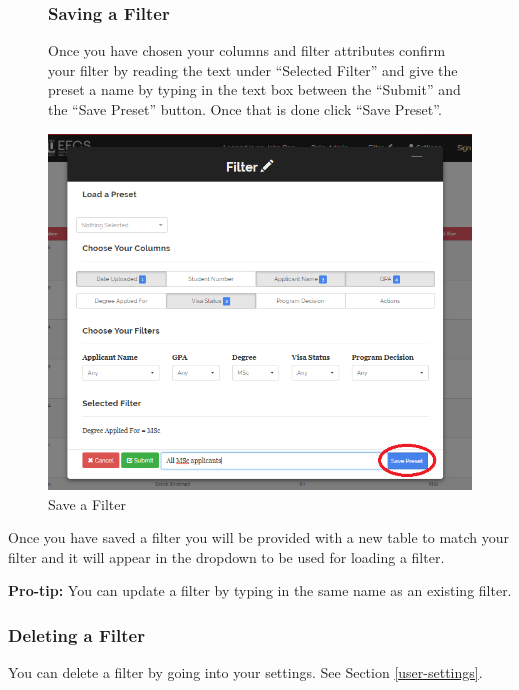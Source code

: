 \documentclass[fontsize=12pt,paper=letter,twoside]{scrartcl}
\begin{document}
\clearpage

\begin{figure}[!htb]
\subsubsection{Saving a Filter}
Once you have chosen your columns and filter attributes confirm your filter by reading the text under ``Selected Filter'' and give the preset a name by typing in the text box between the ``Submit'' and the ``Save Preset'' button. Once that is done click ``Save Preset''.

\begin{center}
\includegraphics[width=.99\textwidth]{images/ma/saving_preset.png}
\end{center}
\caption{Save a Filter}
\label{fig:save_filter}
\end{figure}

\smallskip
\noindent Once you have saved a filter you will be provided with a new table to match your filter and it will appear in the dropdown to be used for loading a filter.

\smallskip
\noindent \textbf{Pro-tip:} You can update a filter by typing in the same name as an existing filter.

\clearpage
\subsubsection{Deleting a Filter}
You can delete a filter by going into your settings. See Section \ref{user-settings}.
\end{document}
